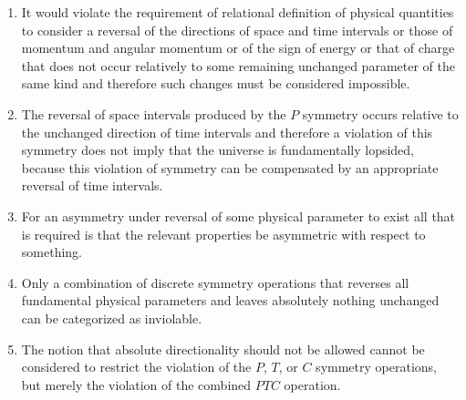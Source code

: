 \documentclass[notitlepage,12pt]{report}
\begin{document}
\begin{enumerate}

\item It would violate the requirement of relational definition of physical quantities to consider a reversal of the directions of space and time intervals or those of momentum and angular momentum or of the sign of energy or that of charge that does not occur relatively to some remaining unchanged parameter of the same kind and therefore such changes must be considered impossible.

\item The reversal of space intervals produced by the $P$ symmetry occurs relative to the unchanged direction of time intervals and therefore a violation of this symmetry does not imply that the universe is fundamentally lopsided, because this violation of symmetry can be compensated by an appropriate reversal of time intervals.

\item For an asymmetry under reversal of some physical parameter to exist all that is required is that the relevant properties be asymmetric with respect to something.

\item Only a combination of discrete symmetry operations that reverses all fundamental physical parameters and leaves absolutely nothing unchanged can be categorized as inviolable.

\item The notion that absolute directionality should not be allowed cannot be considered to restrict the violation of the $P$, $T$, or $C$ symmetry operations, but merely the violation of the combined $PTC$ operation.


\end{enumerate}
\end{document}
